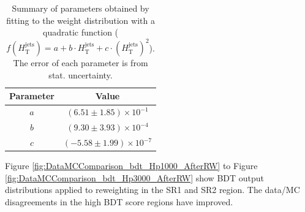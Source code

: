 \begin{table}[H]
  \centering
  \begin{tabular*}{60mm}{c|c}
    \hline\hline
    Parameter & Value\\
    \hline
    $a$ & $( 6.51{\pm}1.85)\times10^{-1}$ \\
    \hline
    $b$ & $( 9.30{\pm}3.93)\times10^{-4}$ \\
    \hline
    $c$ & $(-5.58{\pm}1.99)\times10^{-7}$ \\
    \hline\hline
  \end{tabular*}
  \caption{Summary of parameters obtained by fitting to the weight distribution with a quadratic function ($f(H_{\text{T}}^{\text{jets}}) = a + b \cdot H_{\text{T}}^{\text{jets}} + c \cdot (H_{\text{T}}^{\text{jets}})^{2}$). The error of each parameter is from stat. uncertainty.}
  \label{tab:ParameterOfReweightingFunction}
\end{table}


Figure \ref{fig:DataMCComparison_bdt_Hp1000_AfterRW} to Figure \ref{fig:DataMCComparison_bdt_Hp3000_AfterRW} show BDT output distributions applied to reweighting in the SR1 and SR2 region. The data/MC disagreements in the high BDT score regions have improved.

